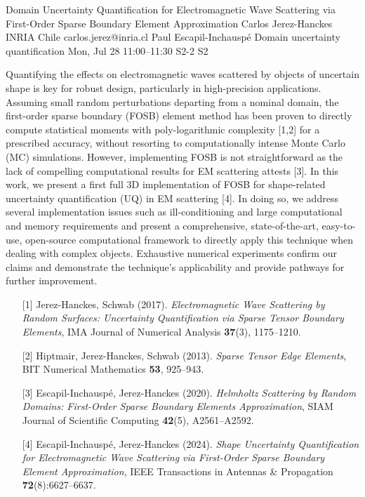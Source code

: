 \begin{talk}
  {Domain Uncertainty Quantification for Electromagnetic Wave Scattering via First-Order Sparse Boundary Element Approximation}%
  {Carlos Jerez-Hanckes}%
  {INRIA Chile}%
  {carlos.jerez@inria.cl}%
  {Paul Escapil-Inchausp\'e}%
  {Domain uncertainty quantification}%
  {Mon, Jul 28 11:00–11:30}%
  {S2-2}%
  {S2}%
				
			
Quantifying the effects on electromagnetic waves scattered by objects of uncertain shape is key for robust design, particularly in high-precision applications. Assuming small random perturbations departing from a nominal domain, the first-order sparse boundary (FOSB) element method has been proven to directly compute statistical moments with poly-logarithmic complexity [1,2] for a prescribed accuracy, without resorting to computationally intense Monte Carlo (MC) simulations. However, implementing FOSB is not straightforward as the lack of compelling computational results for EM scattering attests [3]. In this work, we present a first full 3D implementation of FOSB for shape-related uncertainty quantification (UQ) in EM scattering [4]. In doing so, we address several implementation issues such as ill-conditioning and large computational and memory requirements and present a comprehensive, state-of-the-art, easy-to-use, open-source computational framework to directly apply this technique when dealing with complex objects. Exhaustive numerical experiments confirm our claims and demonstrate the technique's applicability and provide pathways for further improvement.

\medskip

\begin{enumerate}
	\item[{[1]}] Jerez-Hanckes, Schwab (2017). {\it Electromagnetic Wave Scattering by Random Surfaces: Uncertainty Quantification via Sparse Tensor Boundary Elements}, IMA Journal of Numerical Analysis {\bf 37}(3), 1175--1210.
	\item[{[2]}] Hiptmair, Jerez-Hanckes, Schwab (2013). {\it Sparse Tensor Edge Elements}, BIT Numerical Mathematics {\bf 53}, 925--943.
	\item[{[3]}] Escapil-Inchausp\'e, Jerez-Hanckes (2020). {\it Helmholtz Scattering by Random Domains: First-Order Sparse Boundary Elements Approximation}, SIAM Journal of Scientific Computing {\bf 42}(5), A2561--A2592.
	\item[{[4]}] Escapil-Inchausp\'e, Jerez-Hanckes (2024). {\it Shape Uncertainty Quantification for Electromagnetic Wave Scattering via First-Order Sparse Boundary Element Approximation}, IEEE Transactions in Antennas \& Propagation {\bf 72}(8):6627--6637.
\end{enumerate}


\end{talk}
